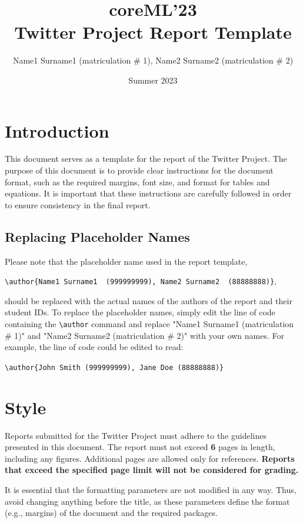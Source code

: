 \documentclass{article}
\title{\large{coreML'23}\vspace{3mm} \\  \Large{Twitter Project Report Template}  }
\author{Name1 Surname1  (matriculation \# 1), Name2 Surname2  (matriculation \# 2)}
\date{Summer 2023}
\begin{document}
\maketitle


\section{Introduction} 
This document serves as a template for the report of the Twitter Project. The purpose of this document is to provide clear instructions for the document format, such as the required margins, font size, and format for tables and equations. It is important that these instructions are carefully followed in order to ensure consistency in the final report.


\subsection{Replacing Placeholder Names}

Please note that the placeholder name used in the report template, 

\verb+\author{Name1 Surname1  (999999999), Name2 Surname2  (88888888)}+,

should be replaced with the actual names of the authors of the report and their student IDs. 
%
To replace the placeholder names, simply edit the line of code containing the \verb+\author+ command and replace "Name1 Surname1  (matriculation \# 1)" and "Name2 Surname2  (matriculation \# 2)" with your own names. For example, the line of code could be edited to read:

\verb+\author{John Smith (999999999), Jane Doe (88888888)}+



\section{Style}




Reports submitted for the Twitter Project must adhere to the guidelines presented in this document. The report must not exceed {\bf 6} pages in length, including any figures. Additional pages are allowed only for references. \textbf{Reports that exceed the specified page limit will not be considered for grading.}


It is essential that the formatting parameters are not modified in any way. Thus, avoid changing anything before the title, as these parameters define the format (e.g., margins) of the document and the required packages.
\end{document}
